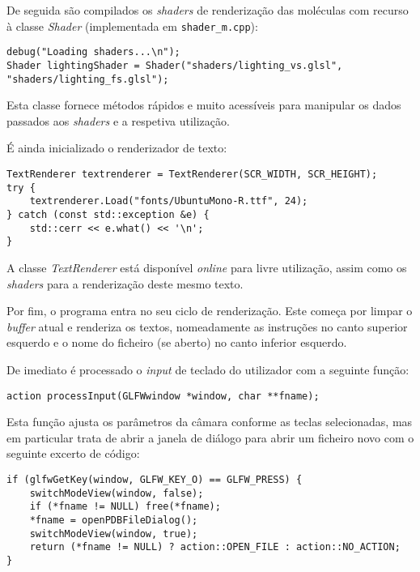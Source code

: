De seguida são compilados os \textit{shaders} de renderização das moléculas com recurso à classe \textit{Shader} (implementada em \verb|shader_m.cpp|):

\begin{verbatim}
debug("Loading shaders...\n");
Shader lightingShader = Shader("shaders/lighting_vs.glsl", "shaders/lighting_fs.glsl");
\end{verbatim}

Esta classe fornece métodos rápidos e muito acessíveis para manipular os dados passados aos \textit{shaders} e a respetiva utilização.

É ainda inicializado o renderizador de texto:

\begin{verbatim}
TextRenderer textrenderer = TextRenderer(SCR_WIDTH, SCR_HEIGHT);
try {
    textrenderer.Load("fonts/UbuntuMono-R.ttf", 24);
} catch (const std::exception &e) {
    std::cerr << e.what() << '\n';
}
\end{verbatim}

A classe \textit{TextRenderer} está disponível \textit{online} \cite{textrender} para livre utilização, assim como os \textit{shaders} para a renderização deste mesmo texto.

Por fim, o programa entra no seu ciclo de renderização. Este começa por limpar o \textit{buffer} atual e renderiza os textos, nomeadamente as instruções no canto superior esquerdo e o nome do ficheiro (se aberto) no canto inferior esquerdo.

De imediato é processado o \textit{input} de teclado do utilizador com a seguinte função:

\begin{verbatim}
action processInput(GLFWwindow *window, char **fname);
\end{verbatim}

Esta função ajusta os parâmetros da câmara conforme as teclas selecionadas, mas em particular trata de abrir a janela de diálogo para abrir um ficheiro novo com o seguinte excerto de código:

\begin{verbatim}
if (glfwGetKey(window, GLFW_KEY_O) == GLFW_PRESS) {
    switchModeView(window, false);
    if (*fname != NULL) free(*fname);
    *fname = openPDBFileDialog();
    switchModeView(window, true);
    return (*fname != NULL) ? action::OPEN_FILE : action::NO_ACTION;
}
\end{verbatim}

